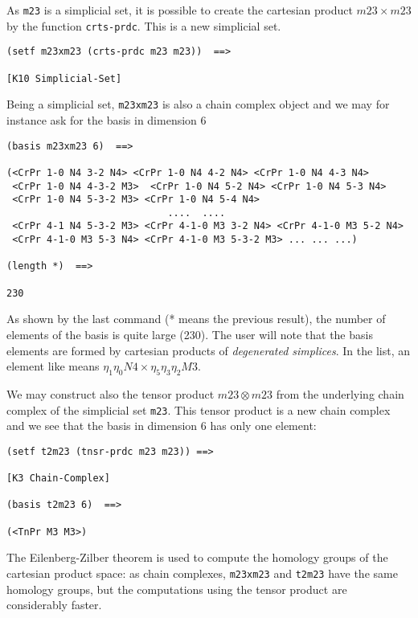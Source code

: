 As {\tt m23} is a simplicial set, it is possible to create the cartesian product
$m23 \times m23$ by the function {\tt crts-prdc}. This is a new simplicial set.
{\footnotesize\begin{verbatim}
(setf m23xm23 (crts-prdc m23 m23))  ==>

[K10 Simplicial-Set]
\end{verbatim}}
Being a simplicial set, {\tt m23xm23} is also a chain complex object and we may for instance ask for
the basis in dimension $6$
{\footnotesize\begin{verbatim}
(basis m23xm23 6)  ==>

(<CrPr 1-0 N4 3-2 N4> <CrPr 1-0 N4 4-2 N4> <CrPr 1-0 N4 4-3 N4> 
 <CrPr 1-0 N4 4-3-2 M3>  <CrPr 1-0 N4 5-2 N4> <CrPr 1-0 N4 5-3 N4> 
 <CrPr 1-0 N4 5-3-2 M3> <CrPr 1-0 N4 5-4 N4>
                            ....  .... 
 <CrPr 4-1 N4 5-3-2 M3> <CrPr 4-1-0 M3 3-2 N4> <CrPr 4-1-0 M3 5-2 N4> 
 <CrPr 4-1-0 M3 5-3 N4> <CrPr 4-1-0 M3 5-3-2 M3> ... ... ...)

(length *)  ==>        

230
\end{verbatim}}
As shown by the last command (* means the previous result), 
the number of elements of the basis is quite large (230). The user
will note that the basis elements are formed by cartesian products of {\em degenerated simplices}. In
the list, an element like {\tt <CrPr 1-0 N4 5-3-2 M3>} means $\eta_1\eta_0 N4 \times \eta_5\eta_3\eta_2 M3$.
\par
We may construct also the tensor product $m23 \otimes m23$ from the underlying chain complex
of the simplicial set {\tt m23}. This tensor product is a new chain complex and we see that the
basis in dimension $6$ has only one element:
{\footnotesize\begin{verbatim}
(setf t2m23 (tnsr-prdc m23 m23)) ==>

[K3 Chain-Complex]

(basis t2m23 6)  ==>

(<TnPr M3 M3>)
\end{verbatim}}
The Eilenberg-Zilber theorem is used to compute the homology groups of the cartesian
product space: as chain complexes, {\tt m23xm23} and {\tt t2m23} have the same homology groups,
but the computations using the tensor product are considerably faster.
